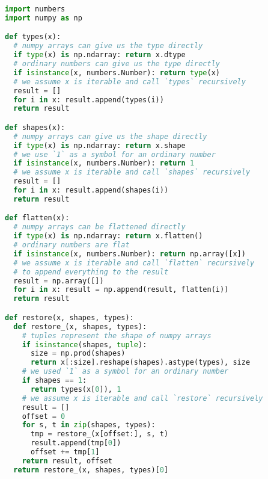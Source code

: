 \begin{lstlisting}[label=lst:deepflat, language=python, caption=deepflatten.py]
import numbers
import numpy as np

def types(x):
  # numpy arrays can give us the type directly
  if type(x) is np.ndarray: return x.dtype
  # ordinary numbers can give us the type directly
  if isinstance(x, numbers.Number): return type(x)
  # we assume x is iterable and call `types` recursively
  result = []
  for i in x: result.append(types(i))
  return result

def shapes(x):
  # numpy arrays can give us the shape directly
  if type(x) is np.ndarray: return x.shape
  # we use `1` as a symbol for an ordinary number
  if isinstance(x, numbers.Number): return 1
  # we assume x is iterable and call `shapes` recursively
  result = []
  for i in x: result.append(shapes(i))
  return result

def flatten(x):
  # numpy arrays can be flattened directly
  if type(x) is np.ndarray: return x.flatten()
  # ordinary numbers are flat
  if isinstance(x, numbers.Number): return np.array([x])
  # we assume x is iterable and call `flatten` recursively
  # to append everything to the result
  result = np.array([])
  for i in x: result = np.append(result, flatten(i))
  return result

def restore(x, shapes, types):
  def restore_(x, shapes, types):
    # tuples represent the shape of numpy arrays
    if isinstance(shapes, tuple):
      size = np.prod(shapes)
      return x[:size].reshape(shapes).astype(types), size
    # we used `1` as a symbol for an ordinary number
    if shapes == 1:
      return types(x[0]), 1
    # we assume x is iterable and call `restore` recursively
    result = []
    offset = 0
    for s, t in zip(shapes, types):
      tmp = restore_(x[offset:], s, t)
      result.append(tmp[0])
      offset += tmp[1]
    return result, offset
  return restore_(x, shapes, types)[0]

\end{lstlisting}

